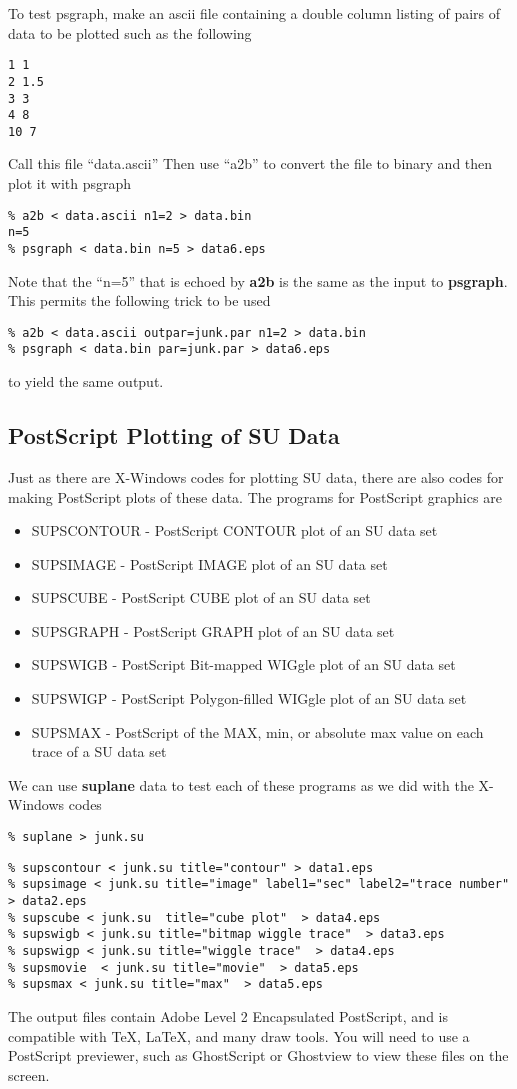 {{{{{{To test psgraph, make an ascii file containing  a double
column listing of pairs of data to be plotted such as the
following
{\small\begin{verbatim}
1 1
2 1.5
3 3
4 8
10 7
\end{verbatim}\noindent
Call this file ``data.ascii''
Then use ``a2b'' to convert the file to binary and then plot it
with psgraph
{\small\begin{verbatim}
% a2b < data.ascii n1=2 > data.bin
n=5
% psgraph < data.bin n=5 > data6.eps
\end{verbatim}}\noindent
Note that the ``n=5'' that is echoed by {\bf a2b\/} is the same as
the input to {\bf psgraph}.
This permits the following trick to be used
{\small\begin{verbatim}
% a2b < data.ascii outpar=junk.par n1=2 > data.bin
% psgraph < data.bin par=junk.par > data6.eps
\end{verbatim}}\noindent
to yield the same output.

\subsection{PostScript Plotting of SU Data}

Just as there are X-Windows codes for plotting SU data, there
are also codes for making PostScript plots of these data.
The programs for PostScript graphics are
\begin{itemize}
\item SUPSCONTOUR - PostScript CONTOUR plot of an SU  data set 
\item SUPSIMAGE - PostScript IMAGE plot of an SU data set
\item SUPSCUBE - PostScript CUBE plot of an SU data set
\item SUPSGRAPH - PostScript GRAPH plot of an SU data set
\item SUPSWIGB - PostScript Bit-mapped WIGgle plot of an SU data set
\item SUPSWIGP - PostScript Polygon-filled WIGgle plot of an SU data set
\item SUPSMAX - PostScript of the MAX, min, or absolute max value on
each trace of a SU data  set
\end{itemize}

We can use {\bf suplane\/} data to test each of these programs
as we did with the X-Windows codes
{\small\begin{verbatim}
% suplane > junk.su
\end{verbatim}}\noindent
{\small\begin{verbatim}
% supscontour < junk.su title="contour" > data1.eps
% supsimage < junk.su title="image" label1="sec" label2="trace number"  > data2.eps
% supscube < junk.su  title="cube plot"  > data4.eps
% supswigb < junk.su title="bitmap wiggle trace"  > data3.eps
% supswigp < junk.su title="wiggle trace"  > data4.eps
% supsmovie  < junk.su title="movie"  > data5.eps
% supsmax < junk.su title="max"  > data5.eps
\end{verbatim}}\noindent
The output files contain Adobe Level 2 Encapsulated PostScript,
and is compatible with TeX, LaTeX, and many draw tools.
You will need to use a PostScript previewer, such as GhostScript
or Ghostview to view these files on the screen.

}}}}}}}
